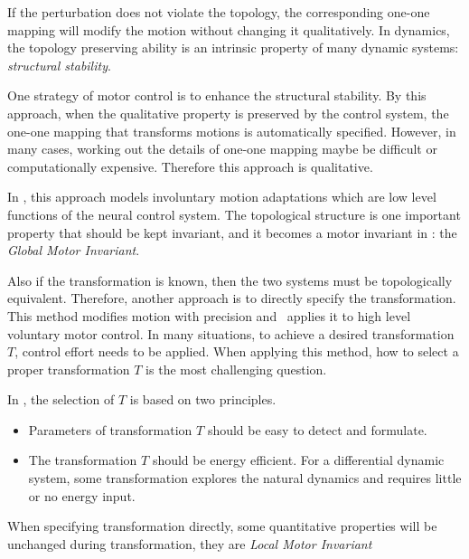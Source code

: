 If the perturbation does not violate the topology, the corresponding one-one mapping will modify the motion without changing it qualitatively.
In dynamics, the topology preserving ability is an intrinsic property of many dynamic systems:
\emph{structural stability}.

One strategy of motor control is to enhance the structural stability. 
By this approach, when the qualitative property is preserved by the control system, the one-one mapping that transforms motions is automatically specified. 
However, in many cases, working out the details of one-one mapping maybe be difficult or computationally expensive.
Therefore this approach is qualitative.

In {\moit}, this approach models involuntary motion adaptations which are low level functions of the neural control system.
The topological structure is one important property that should be kept invariant, and it becomes a motor invariant in {\moit}: the \emph{Global Motor Invariant}.






Also if the transformation is known, then the two systems must be topologically equivalent.
Therefore, another approach is to directly specify the transformation.
This method  modifies motion with precision and {\moit}\ applies it to high level voluntary motor control.
In many situations, to achieve a desired transformation $T$, control effort needs to be applied.
When applying this method, how to select a proper transformation $T$ is the most challenging  question.

In {\moit}, the selection of $T$ is based on two principles.
\begin{itemize}
\item
Parameters of transformation $T$ should be easy to detect and formulate.
\item 
The transformation $T$ should be energy efficient.
For a differential dynamic system, some transformation explores the natural dynamics and requires little or no energy input.
\end{itemize}

When specifying transformation directly, some quantitative properties will be unchanged during transformation, they are \emph{Local Motor Invariant}






%
%
%
%
%




